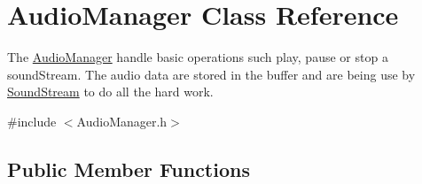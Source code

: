 \hypertarget{classAudioManager}{}\section{Audio\+Manager Class Reference}
\label{classAudioManager}


The \hyperlink{classAudioManager}{Audio\+Manager} handle basic operations such play, pause or stop a sound\+Stream. The audio data are stored in the buffer and are being use by \hyperlink{classSoundStream}{Sound\+Stream} to do all the hard work.  




{\ttfamily \#include $<$Audio\+Manager.\+h$>$}

\subsection*{Public Member Functions}

